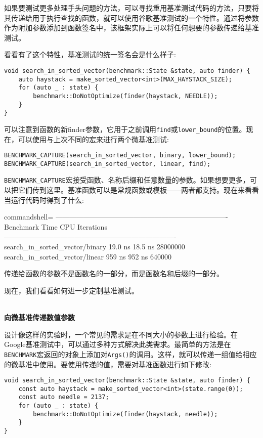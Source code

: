 如果要测试更多处理手头问题的方法，可以寻找重用基准测试代码的方法，只要将其传递给用于执行查找的函数，就可以使用谷歌基准测试的一个特性。通过将参数作为附加参数添加到函数签名中，该框架实际上可以将任何想要的参数传递给基准测试。

看看有了这个特性，基准测试的统一签名会是什么样子:

\begin{lstlisting}[style=styleCXX]
void search_in_sorted_vector(benchmark::State &state, auto finder) {
	auto haystack = make_sorted_vector<int>(MAX_HAYSTACK_SIZE);
	for (auto _ : state) {
		benchmark::DoNotOptimize(finder(haystack, NEEDLE));
	}
}
\end{lstlisting}

可以注意到函数的新finder参数，它用于之前调用\texttt{find}或\texttt{lower\_bound}的位置。现在，可以使用与上次不同的宏来进行两个微基准测试:

\begin{lstlisting}[style=styleCXX]
BENCHMARK_CAPTURE(search_in_sorted_vector, binary, lower_bound);
BENCHMARK_CAPTURE(search_in_sorted_vector, linear, find);
\end{lstlisting}

\texttt{BENCHMARK\_CAPTURE}宏接受函数、名称后缀和任意数量的参数。如果想要更多，可以把它们传到这里。基准函数可以是常规函数或模板——两者都支持。现在来看看当运行代码时得到了什么:

\begin{tcblisting}{commandshell={}}
-------------------------------------------------------------------------
Benchmark Time CPU Iterations
-------------------------------------------------------------------------
search_in_sorted_vector/binary 19.0 ns 18.5 ns 28000000
search_in_sorted_vector/linear 959 ns 952 ns 640000
\end{tcblisting}

传递给函数的参数不是函数名的一部分，而是函数名和后缀的一部分。

现在，我们看看如何进一步定制基准测试。

\hspace*{\fill} \\ %
\noindent
\textbf{向微基准传递数值参数}

设计像这样的实验时，一个常见的需求是在不同大小的参数上进行检验。在Google基准测试中，可以通过多种方式解决此类需求。最简单的方法是在\texttt{BENCHMARK}宏返回的对象上添加对\texttt{Args()}的调用。这样，就可以传递一组值给相应的微基准中使用。要使用传递的值，需要对基准函数进行如下修改:

\begin{lstlisting}[style=styleCXX]
void search_in_sorted_vector(benchmark::State &state, auto finder) {
	const auto haystack = make_sorted_vector<int>(state.range(0));
	const auto needle = 2137;
	for (auto _ : state) {
		benchmark::DoNotOptimize(finder(haystack, needle));
	}
}
\end{lstlisting}


